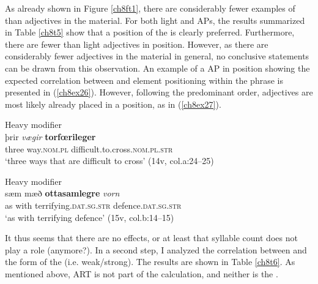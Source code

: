 \documentclass[output=paper,colorlinks,citecolor=brown]{langscibook}
\begin{document}
As already shown in Figure \ref{ch8ft1}, there are considerably fewer examples of
 than  adjectives in the
 material. For both light and  APs, the results summarized
in Table \ref{ch8t5} show that a  position of the  is clearly
preferred. Furthermore, there are fewer  than light
adjectives in  position. However, as there are considerably
fewer  adjectives in the  material in general, no conclusive
statements can be drawn from this observation. An example of a  AP
in  position showing the expected correlation between
 and element positioning within the phrase is presented
in (\ref{ch8ex26}). However, following the predominant order,  adjectives are
most likely already placed in a  position, as in (\ref{ch8ex27}).

\begin{exe}
\ex\label{ch8ex26}Heavy  modifier\\
\gll þrir \textit{vægir} \textbf{torfœrileger}~ \\
three way.\textsc{nom.pl} difficult.to.cross.\textsc{nom.pl.str}\\
\glt `three ways that are difficult to cross' (14v, col.a:24--25)

\ex\label{ch8ex27}Heavy  modifier\\
\gll sæm mæð \textbf{ottasamlegre} \textit{vorn} \\
as with terrifying.\textsc{dat.sg.str} defence.\textsc{dat.sg.str}\\
\glt `as with terrifying defence' (15v, col.b:14--15)
\end{exe}

It thus seems that there are no  effects, or at least that
syllable count does not play a role (anymore?). In a second step, I
analyzed the correlation between  and the form of the
 (i.e. weak/strong). The results are shown in Table \ref{ch8t6}. As
mentioned above, ART is not part of the calculation, and neither is the
.
\end{document}
